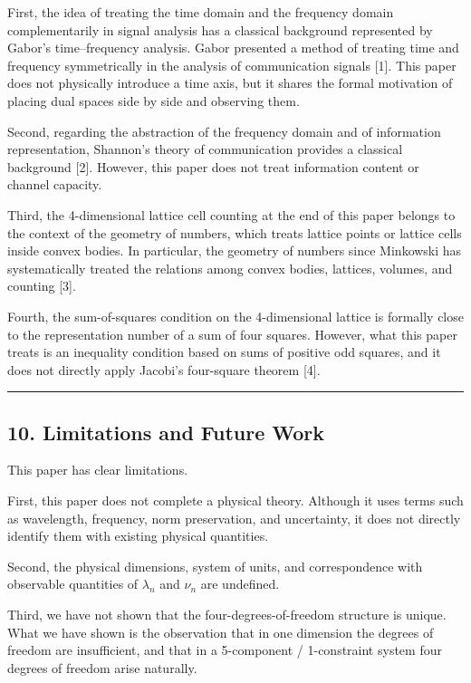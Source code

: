 \documentclass[
]{article}
\begin{document}
First, the idea of treating the time domain and the frequency domain
complementarily in signal analysis has a classical background
represented by Gabor's time--frequency analysis. Gabor presented a
method of treating time and frequency symmetrically in the analysis of
communication signals {[}1{]}. This paper does not physically introduce
a time axis, but it shares the formal motivation of placing dual spaces
side by side and observing them.

Second, regarding the abstraction of the frequency domain and of
information representation, Shannon's theory of communication provides a
classical background {[}2{]}. However, this paper does not treat
information content or channel capacity.

Third, the 4-dimensional lattice cell counting at the end of this paper
belongs to the context of the geometry of numbers, which treats lattice
points or lattice cells inside convex bodies. In particular, the
geometry of numbers since Minkowski has systematically treated the
relations among convex bodies, lattices, volumes, and counting {[}3{]}.

Fourth, the sum-of-squares condition on the 4-dimensional lattice is
formally close to the representation number of a sum of four squares.
However, what this paper treats is an inequality condition based on sums
of positive odd squares, and it does not directly apply Jacobi's
four-square theorem {[}4{]}.

\begin{center}\rule{0.5\linewidth}{0.5pt}\end{center}

\subsection{10. Limitations and Future
Work}\label{limitations-and-future-work}

This paper has clear limitations.

First, this paper does not complete a physical theory. Although it uses
terms such as wavelength, frequency, norm preservation, and uncertainty,
it does not directly identify them with existing physical quantities.

Second, the physical dimensions, system of units, and correspondence
with observable quantities of \(\lambda_n\) and \(\nu_n\) are undefined.

Third, we have not shown that the four-degrees-of-freedom structure is
unique. What we have shown is the observation that in one dimension the
degrees of freedom are insufficient, and that in a 5-component /
1-constraint system four degrees of freedom arise naturally.
\end{document}
